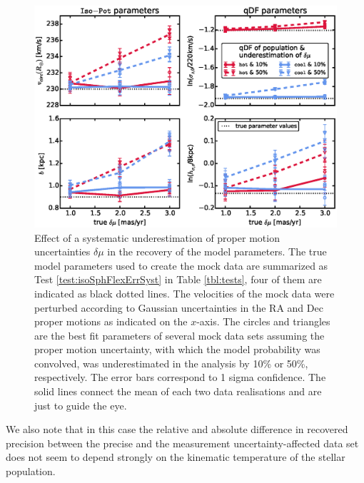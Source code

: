 \begin{figure}[!htbp]
\centering
\includegraphics[width=\columnwidth]{figs/isoSphFlexErrSyst_offset_vs_error.eps}
\caption{Effect of a systematic underestimation of proper motion uncertainties $\delta \mu$ in the recovery of the model parameters. The true model parameters used to create the mock data are summarized as Test \ref{test:isoSphFlexErrSyst} in Table \ref{tbl:tests}, four of them are indicated as black dotted lines. The velocities of the mock data were perturbed according to Gaussian uncertainties in the RA and Dec proper motions as indicated on the $x$-axis. The circles and triangles are the best fit parameters of several mock data sets assuming the proper motion uncertainty, with which the model probability was convolved, was underestimated in the analysis by 10\% or 50\%, respectively. The error bars correspond to 1 sigma confidence. The solid lines connect the mean of each two data realisations and are just to guide the eye.}
\label{fig:isoSphFlexErrSyst}
\end{figure}







We also note that in this case the relative and absolute difference in recovered precision between the precise and the measurement uncertainty-affected data set does not seem to depend strongly on the kinematic temperature of the stellar population.

